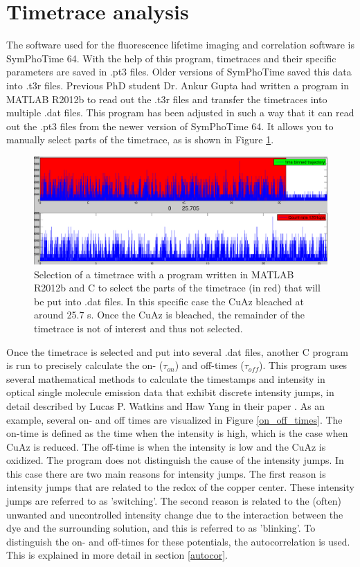 \documentclass[twoside,single]{lion-msc}
\begin{document}
\section*{Timetrace analysis}
The software used for the fluorescence lifetime imaging and correlation software is SymPhoTime 64. With the help of this program, timetraces and their specific parameters are saved in .pt3 files. Older versions of SymPhoTime saved this data into .t3r files. Previous PhD student Dr. Ankur Gupta had written a program in MATLAB R2012b to read out the .t3r files and transfer the timetraces into multiple .dat files. This program has been adjusted in such a way that it can read out the .pt3 files from the newer version of SymPhoTime 64. It allows you to manually select parts of the timetrace, as is shown in Figure \ref{timetrace_selection}.

\begin{figure}[ht!]
\centering
\includegraphics[width=\textwidth]{timetrace_selection}
\caption{Selection of a timetrace with a program written in MATLAB R2012b and C to select the parts of the timetrace (in red) that will be put into .dat files. In this specific case the CuAz bleached at around 25.7 s. Once the CuAz is bleached, the remainder of the timetrace is not of interest and thus not selected.}
\label{timetrace_selection}
\end{figure}

Once the timetrace is selected and put into several .dat files, another C program is run to precisely calculate the  on- ($\tau_{on}$) and off-times ($\tau_{off}$). This program uses several mathematical methods to calculate the timestamps and intensity in optical single molecule emission data that exhibit discrete intensity jumps, in detail described by Lucas P. Watkins and Haw Yang in their paper \cite{And2004}. As an example, several on- and off times are visualized in Figure \ref{on_off_times}. The on-time is defined as the time when the intensity is high, which is the case when CuAz is reduced. The off-time is when the intensity is low and the CuAz is oxidized. The program does not distinguish the cause of the intensity jumps. In this case there are two main reasons for intensity jumps. The first reason is intensity jumps that are related to the redox of the copper center. These intensity jumps are referred to as 'switching'. The second reason is related to the (often) unwanted and uncontrolled intensity change due to the interaction between the dye and the surrounding solution, and this is referred to as 'blinking'. To distinguish the on- and off-times for these potentials, the autocorrelation is used. This is explained in more detail in section \ref{autocor}.
\end{document}

